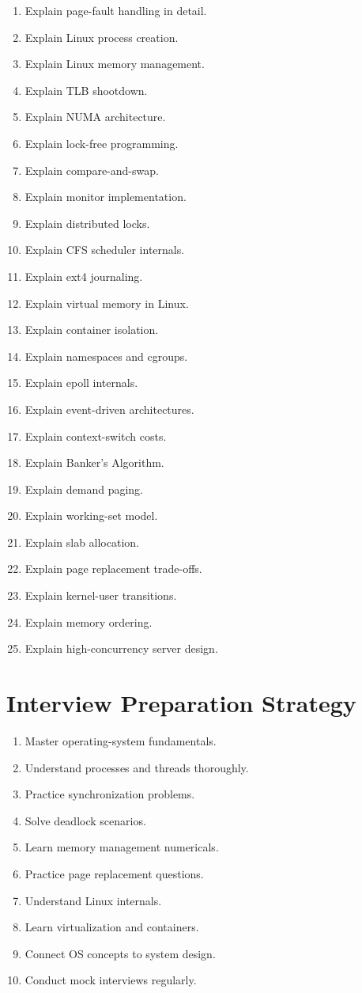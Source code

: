 \begin{enumerate}
\item Explain page-fault handling in detail.
\item Explain Linux process creation.
\item Explain Linux memory management.
\item Explain TLB shootdown.
\item Explain NUMA architecture.
\item Explain lock-free programming.
\item Explain compare-and-swap.
\item Explain monitor implementation.
\item Explain distributed locks.
\item Explain CFS scheduler internals.
\item Explain ext4 journaling.
\item Explain virtual memory in Linux.
\item Explain container isolation.
\item Explain namespaces and cgroups.
\item Explain epoll internals.
\item Explain event-driven architectures.
\item Explain context-switch costs.
\item Explain Banker's Algorithm.
\item Explain demand paging.
\item Explain working-set model.
\item Explain slab allocation.
\item Explain page replacement trade-offs.
\item Explain kernel-user transitions.
\item Explain memory ordering.
\item Explain high-concurrency server design.
\end{enumerate}

\section{Interview Preparation Strategy}

\begin{enumerate}
\item Master operating-system fundamentals.
\item Understand processes and threads thoroughly.
\item Practice synchronization problems.
\item Solve deadlock scenarios.
\item Learn memory management numericals.
\item Practice page replacement questions.
\item Understand Linux internals.
\item Learn virtualization and containers.
\item Connect OS concepts to system design.
\item Conduct mock interviews regularly.
\end{enumerate}

